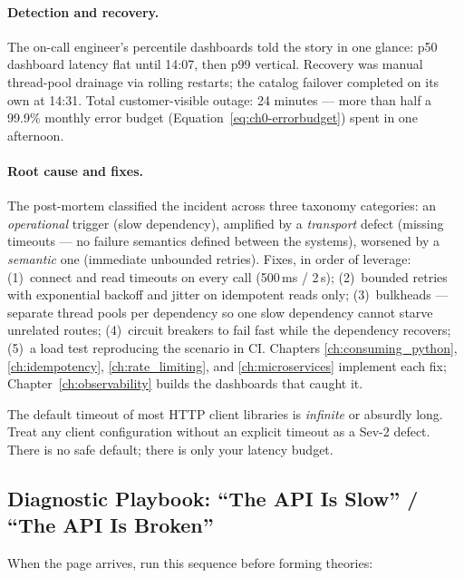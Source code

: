 \paragraph{Detection and recovery.}
The on-call engineer's percentile dashboards told the story in one glance:
p50 dashboard latency flat until 14:07, then p99 vertical. Recovery was
manual thread-pool drainage via rolling restarts; the catalog failover
completed on its own at 14:31. Total customer-visible outage: 24 minutes ---
more than half a 99.9\% monthly error budget
(Equation~\eqref{eq:ch0-errorbudget}) spent in one afternoon.

\paragraph{Root cause and fixes.}
The post-mortem classified the incident across three taxonomy categories: an
\emph{operational} trigger (slow dependency), amplified by a \emph{transport}
defect (missing timeouts --- no failure semantics defined between the
systems), worsened by a \emph{semantic} one (immediate unbounded retries).
Fixes, in order of leverage: (1)~connect and read timeouts on every call
(500\,ms / 2\,s); (2)~bounded retries with exponential backoff and jitter on
idempotent reads only; (3)~bulkheads --- separate thread pools per
dependency so one slow dependency cannot starve unrelated routes;
(4)~circuit breakers to fail fast while the dependency recovers; (5)~a load
test reproducing the scenario in CI. Chapters \ref{ch:consuming_python},
\ref{ch:idempotency}, \ref{ch:rate_limiting}, and \ref{ch:microservices}
implement each fix; Chapter~\ref{ch:observability} builds the dashboards that
caught it.

\begin{warningbox}
The default timeout of most HTTP client libraries is \emph{infinite} or
absurdly long. Treat any client configuration without an explicit timeout as
a Sev-2 defect. There is no safe default; there is only your latency budget.
\end{warningbox}

\subsection{Diagnostic Playbook: ``The API Is Slow'' / ``The API Is Broken''}
\label{sec:ch0-playbook}

When the page arrives, run this sequence before forming theories:

